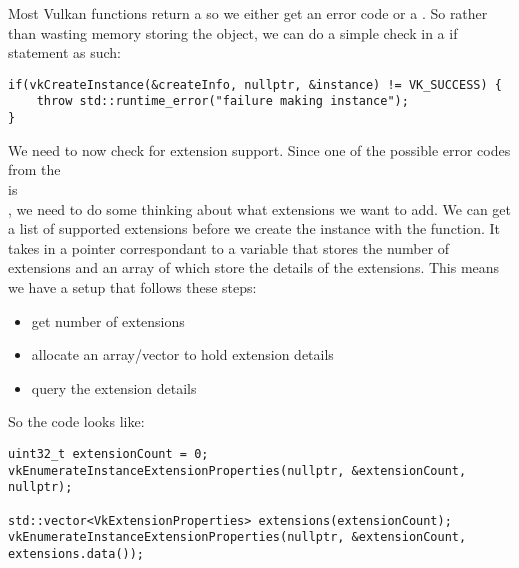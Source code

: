 \par Most Vulkan functions return a  so we either get an error code or a . So rather than wasting memory storing the object, we can do a simple check in a if statement as such:

\begin{center}
    \begin{minipage}{0.95\linewidth}
\begin{lstlisting}
if(vkCreateInstance(&createInfo, nullptr, &instance) != VK_SUCCESS) {
    throw std::runtime_error("failure making instance");
}
\end{lstlisting}
\end{minipage}
\end{center}

\par We need to now check for extension support. Since one of the possible error codes from the \\  is\\ , we need to do some thinking about what extensions we want to add. We can get a list of supported extensions before we create the instance with the  function. It takes in a pointer correspondant to a variable that stores the number of extensions and an array of  which store the details of the extensions. This means we have a setup that follows these steps:
\begin{itemize}
    \item get number of extensions
    \item allocate an array/vector to hold extension details
    \item query the extension details
\end{itemize}

\par So the code looks like:

\begin{center}
\begin{minipage}{0.95\linewidth}
\begin{lstlisting}
uint32_t extensionCount = 0;
vkEnumerateInstanceExtensionProperties(nullptr, &extensionCount, nullptr);

std::vector<VkExtensionProperties> extensions(extensionCount);
vkEnumerateInstanceExtensionProperties(nullptr, &extensionCount, extensions.data());

\end{lstlisting}
\end{minipage}
\end{center}

